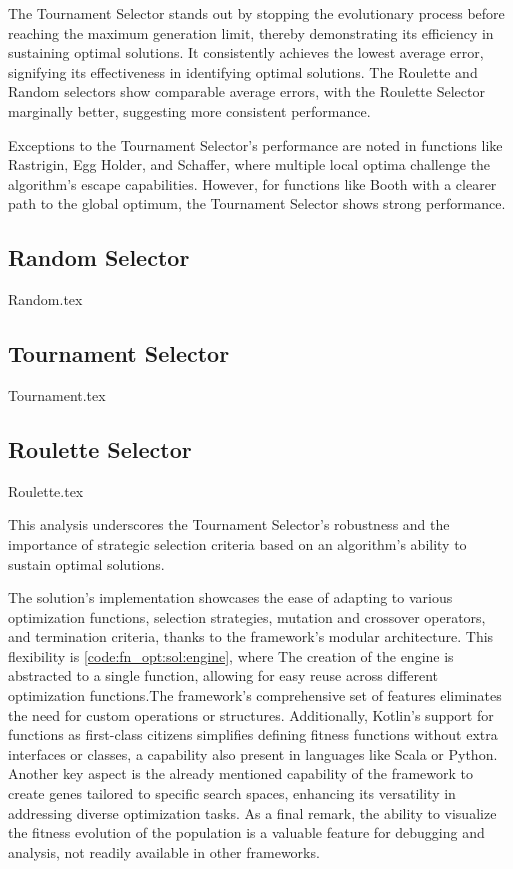     The Tournament Selector stands out by stopping the evolutionary process before reaching the maximum generation 
    limit, thereby demonstrating its efficiency in sustaining optimal solutions. It consistently achieves the lowest 
    average error, signifying its effectiveness in identifying optimal solutions. The Roulette and Random selectors 
    show comparable average errors, with the Roulette Selector marginally better, suggesting more consistent 
    performance.
    
    Exceptions to the Tournament Selector's performance are noted in functions like Rastrigin, Egg Holder, and 
    Schaffer, where multiple local optima challenge the algorithm's escape capabilities. However, for functions like 
    Booth with a clearer path to the global optimum, the Tournament Selector shows strong performance.
    
    \begin{center}
        \subsection{Random Selector}
            {Random.tex}
        \subsection{Tournament Selector}
            {Tournament.tex}
        \subsection{Roulette Selector}
            {Roulette.tex}
    \end{center}
    
    This analysis underscores the Tournament Selector's robustness and the importance of strategic selection criteria 
    based on an algorithm's ability to sustain optimal solutions.

    The solution's implementation showcases the ease of adapting to various optimization functions, selection 
    strategies, mutation and crossover operators, and termination criteria, thanks to the framework's modular 
    architecture. This flexibility is \vref{code:fn_opt:sol:engine}, where The creation of the engine is abstracted to
    a single function, allowing for easy reuse across different optimization functions.The framework's comprehensive 
    set of features eliminates the need for custom operations or structures. Additionally, Kotlin's support for 
    functions as first-class citizens simplifies defining fitness functions without extra interfaces or classes, a 
    capability also present in languages like Scala or Python. Another key aspect is the already mentioned capability of
    the framework to create genes tailored to specific search spaces, enhancing its versatility in addressing diverse
    optimization tasks. As a final remark, the ability to visualize the fitness evolution of the population is a
    valuable feature for debugging and analysis, not readily available in other frameworks.